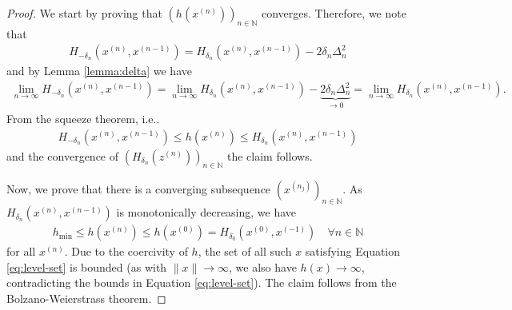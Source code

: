 \documentclass[onecolumn,final,a4paper,13pt,reqno]{siamart}
\makeatletter
\DeclareRobustCommand\onedot{\futurelet\@let@token\@onedot}
\def\@onedot{\ifx\@let@token.\else.\null\fi\xspace}
\def\ie{{i.e}\onedot} \def\Ie{{I.e}\onedot}
\makeatother
\begin{document}
\begin{proof}
	We start by proving that $(h(x^{(n)}))_{n \in \mathbb{N}}$ converges. Therefore, we note that
	\begin{align}
		H_{-\delta_n}(x^{(n)}, x^{(n - 1)}) = H_{\delta_n}(x^{(n)}, x^{(n - 1)}) - 2\delta_n \Delta_n^2
	\end{align}
	and by Lemma \ref{lemma:delta} we have
	\begin{align}
		\lim_{n \rightarrow \infty} H_{-\delta_n}(x^{(n)}, x^{(n - 1)}) = \lim_{n \rightarrow \infty} H_{\delta_n}(x^{(n)}, x^{(n - 1)}) - \underbrace{2\delta_n\Delta_n^2}_{\rightarrow 0} = \lim_{n \rightarrow \infty} H_{\delta_n}(x^{(n)}, x^{(n - 1)}).
	\end{align}
	From the squeeze theorem, \ie
	\begin{align}
		H_{-\delta_n} (x^{(n)}, x^{(n - 1)}) \leq h(x^{(n)}) \leq H_{\delta_n}(x^{(n)}, x^{(n - 1)})
	\end{align}
	and the convergence of $(H_{\delta_n}(z^{(n)}))_{n \in \mathbb{N}}$ the claim follows.
	
	Now, we prove that there is a converging subsequence $(x^{(n_j)})_{n \in \mathbb{N}}$. As $H_{\delta_n}(x^{(n)}, x^{(n - 1)})$ is monotonically decreasing, we have
	\begin{align}
		h_{\min} \leq h(x^{(n)}) \leq h(x^{(0)}) = H_{\delta_0}(x^{(0)}, x^{(-1)})\quad\forall n\in\mathbb{N}\label{eq:level-set}
	\end{align}
	for all $x^{(n)}$. Due to the coercivity of $h$, the set of all such $x$ satisfying Equation \eqref{eq:level-set} is bounded (as with $\|x\| \rightarrow \infty$, we also have $h(x) \rightarrow \infty$, contradicting the bounds in Equation \eqref{eq:level-set}). The claim follows from the Bolzano-Weierstrass theorem.
	

\end{proof}
\end{document}

